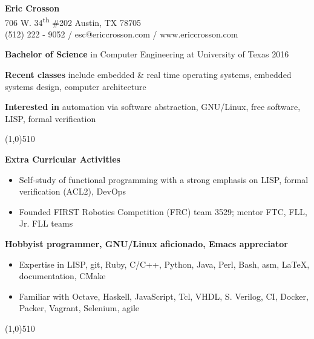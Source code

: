 \documentclass{report}
\newcommand{\cut}{\begin{center} \line(1,0){510} \end{center}}
\begin{document}
\pagestyle{empty}
\setlength\parindent{0pt}

\begin{center}
  \textbf{Eric Crosson} \\
  706 W. 34\textsuperscript{th} \#202 Austin, TX 78705 \\
  (512) 222 - 9052 / esc@ericcrosson.com / www.ericcrosson.com
\end{center}

\textbf{Bachelor of Science} in Computer Engineering at University of Texas
2016

\vspace{1mm}

\textbf{Recent classes} include embedded \& real time operating systems,
embedded systems design, computer architecture

\vspace{1mm}

\textbf{Interested in} automation via software abstraction, GNU/Linux, free
software, LISP, formal verification

\cut{}

\textbf{Extra Curricular Activities}
\begin{itemize}[label=$\circ$]
\item Self-study of functional programming with a strong emphasis on LISP,
  formal verification (ACL2), DevOps
\item Founded FIRST Robotics Competition (FRC) team 3529; mentor FTC, FLL, Jr. FLL teams
\end{itemize}

\textbf{Hobbyist programmer, GNU/Linux aficionado, Emacs appreciator}
\begin{itemize}[label=$\circ$]
\item Expertise in LISP, git, Ruby, C/C++, Python, Java, Perl, Bash, asm,
  \LaTeX{}, documentation, CMake
\item Familiar with Octave, Haskell, JavaScript, Tcl, VHDL, S.
  Verilog, CI, Docker, Packer, Vagrant, Selenium, agile
\end{itemize}

\cut{}
\end{document}
